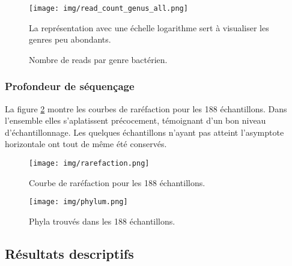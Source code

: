\documentclass[12pt,a4paper]{article}
\begin{document}
\begin{figure}
\begin{center}
\texttt{[image: img/read\_count\_genus\_all.png]}\hfill
\caption{Nombre de reads par genre bactérien.} La représentation avec une échelle logarithme sert à visualiser les genres peu abondants.
\label{readgenus}
\end{center}

\end{figure}


\subsubsection{Profondeur de séquençage}
La figure \ref{rarefaction} montre les courbes de raréfaction pour les 188 échantillons.
Dans l'ensemble elles s’aplatissent précocement, témoignant d’un bon niveau d'échantillonnage. Les quelques échantillons n'ayant pas atteint l'asymptote horizontale ont tout de même été conservés.

\begin{figure}[H]
\begin{center}
\texttt{[image: img/rarefaction.png]}\hfill
\end{center}
\caption{Courbe de raréfaction pour les 188 échantillons. }
\label{rarefaction}
\end{figure}


\begin{figure}[!ht]
\begin{center}
\texttt{[image: img/phylum.png]}\hfill
\end{center}
\caption{Phyla trouvés dans les 188 échantillons.}
\label{phylum}
\end{figure}

\subsection{Résultats descriptifs}
\end{document}
